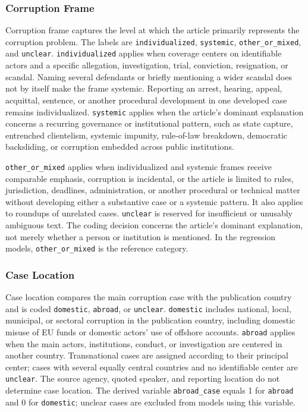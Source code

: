 \subsubsection{Corruption Frame}

Corruption frame captures the level at which the article primarily represents
the corruption problem. The labels are \nolinkurl{individualized},
\nolinkurl{systemic}, \nolinkurl{other_or_mixed}, and \nolinkurl{unclear}.
\nolinkurl{individualized} applies when coverage centers on identifiable actors
and a specific allegation, investigation, trial, conviction, resignation, or
scandal. Naming several defendants or briefly mentioning a wider scandal does
not by itself make the frame systemic. Reporting an arrest, hearing, appeal,
acquittal, sentence, or another procedural development in one developed case
remains individualized. \nolinkurl{systemic} applies when the
article's dominant explanation concerns a recurring governance or institutional
pattern, such as state capture, entrenched clientelism, systemic impunity,
rule-of-law breakdown, democratic backsliding, or corruption embedded across
public institutions.

\nolinkurl{other_or_mixed} applies when individualized and systemic frames
receive comparable emphasis, corruption is incidental, or the article is
limited to rules, jurisdiction, deadlines, administration, or another
procedural or technical matter without developing either a substantive case or
a systemic pattern. It also applies to roundups of unrelated cases.
\nolinkurl{unclear} is reserved for insufficient or
unusably ambiguous text. The coding decision concerns the article's dominant
explanation, not merely whether a person or institution is mentioned. In the
regression models, \nolinkurl{other_or_mixed} is the reference category.

\subsubsection{Case Location}

Case location compares the main corruption case with the publication country
and is coded \nolinkurl{domestic}, \nolinkurl{abroad}, or \nolinkurl{unclear}.
\nolinkurl{domestic} includes national, local, municipal, or sectoral corruption
in the publication country, including domestic misuse of EU funds or domestic
actors' use of offshore accounts. \nolinkurl{abroad} applies when the main actors,
institutions, conduct, or investigation are centered in another country.
Transnational cases are assigned according to their principal center; cases
with several equally central countries and no identifiable center are
\nolinkurl{unclear}. The source agency, quoted speaker, and reporting location do
not determine case location. The derived variable \nolinkurl{abroad_case} equals
1 for \nolinkurl{abroad} and 0 for \nolinkurl{domestic}; unclear cases are excluded
from models using this variable.

